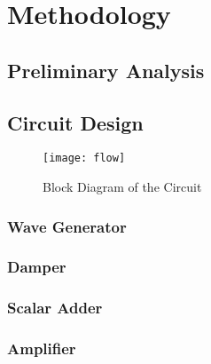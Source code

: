 \documentclass[class=article,crop=false]{standalone}
\begin{document}
\twocolumn

\section{Methodology}
\subsection{Preliminary Analysis}
\subsection{Circuit Design}
\begin{figure}
    \begin{center}
        \texttt{[image: flow]}
        \caption*{Block Diagram of the Circuit}
    \end{center}
\end{figure}
\subsubsection{Wave Generator}
\subsubsection{Damper}
\subsubsection{Scalar Adder}
\subsubsection{Amplifier}
\end{document}
